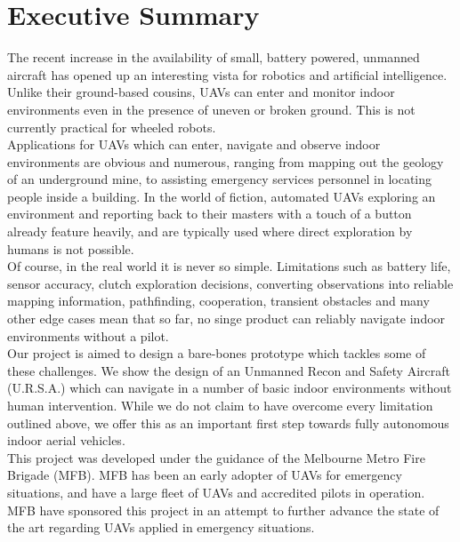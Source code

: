 \documentclass[capstone_report.tex]{subfiles}
\begin{document}
\chapter*{Executive Summary}                                
The recent increase in the availability of small, battery powered, unmanned aircraft has opened up an interesting vista for robotics and artificial intelligence. Unlike their ground-based cousins, UAVs can enter and monitor indoor environments even in the presence of uneven or broken ground. This is not currently practical for wheeled robots. \\

Applications for UAVs which can enter, navigate and observe indoor environments are obvious and numerous, ranging from mapping out the geology of an underground mine, to assisting emergency services personnel in locating people inside a building. In the world of fiction, automated UAVs exploring an environment and reporting back to their masters with a touch of a button already feature heavily, and are typically used where direct exploration by humans is not possible.\\

Of course, in the real world it is never so simple. Limitations such as battery life, sensor accuracy, clutch exploration decisions, converting observations into reliable mapping information, pathfinding, cooperation, transient obstacles and many other edge cases mean that so far, no singe product can reliably navigate indoor environments without a pilot.\\

Our project is aimed to design a bare-bones prototype which tackles some of these challenges. We show the design of an Unmanned Recon and Safety Aircraft (U.R.S.A.) which can navigate in a number of basic indoor environments without human intervention. While we do not claim to have overcome every limitation outlined above, we offer this as an important first step towards fully autonomous indoor aerial vehicles. \\

This project was developed under the guidance of the Melbourne Metro Fire Brigade (MFB). MFB has been an early adopter of UAVs for emergency situations, and have a large fleet of UAVs and accredited pilots in operation. MFB have sponsored this project in an attempt to further advance the state of the art regarding UAVs applied in emergency situations.\\
\end{document}
